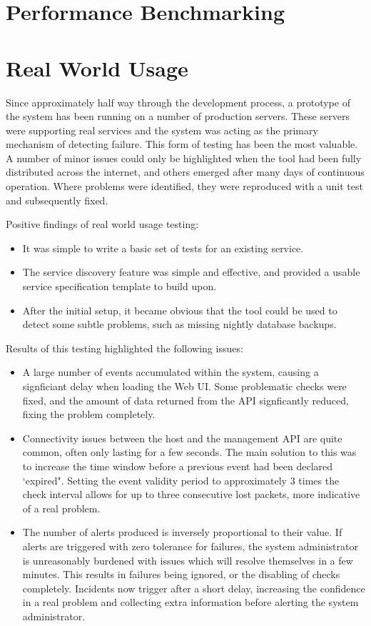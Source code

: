 \documentclass{cshonours}
\begin{document}
\section{Performance Benchmarking}
\section{Real World Usage}

Since approximately half way through the development process, a prototype of the system has been running on a number of production servers. These servers were supporting real services and the system was acting as the primary mechanism of detecting failure. This form of testing has been the most valuable. A number of minor issues could only be highlighted when the tool had been fully distributed across the internet, and others emerged after many days of continuous operation. Where problems were identified, they were reproduced with a unit test and subsequently fixed.

Positive findings of real world usage testing:

\begin{itemize}
  \item It was simple to write a basic set of tests for an existing service.
  \item The service discovery feature was simple and effective, and provided a usable service specification template to build upon.
  \item After the initial setup, it became obvious that the tool could be used to detect some subtle problems, such as missing nightly database backups.
\end{itemize}

Results of this testing highlighted the following issues:

\begin{itemize}
  \item A large number of events accumulated within the system, causing a signficiant delay when loading the Web UI. Some problematic checks were fixed, and the amount of data returned from the API signficantly reduced, fixing the problem completely.
  \item Connectivity issues between the host and the management API are quite common, often only lasting for a few seconds. The main solution to this was to increase the time window before a previous event had been declared `expired". Setting the event validity period to approximately 3 times the check interval allows for up to three consecutive lost packets, more indicative of a real problem.
  \item The number of alerts produced is inversely proportional to their value. If alerts are triggered with zero tolerance for failures, the system administrator is unreasonably burdened with issues which will resolve themselves in a few minutes. This results in failures being ignored, or the disabling of checks completely. Incidents now trigger after a short delay, increasing the confidence in a real problem and collecting extra information before alerting the system administrator.
\end{itemize}
\end{document}

